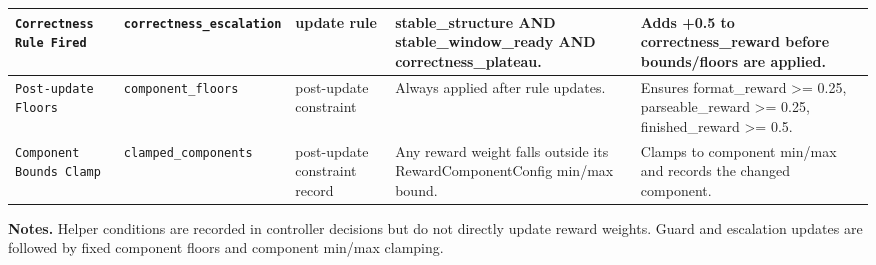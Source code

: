 \documentclass[10pt]{article}
\begin{document}
\begin{longtable}{L{0.14\textwidth} L{0.14\textwidth} L{0.11\textwidth} L{0.32\textwidth} L{0.22\textwidth}}
\midrule
\texttt{Correctness Rule Fired} &
\texttt{correctness\_escalation} &
update rule &
stable\_structure AND stable\_window\_ready AND correctness\_plateau. &
Adds +0.5 to correctness\_reward before bounds/floors are applied. \\
\midrule
\texttt{Post-update Floors} &
\texttt{component\_floors} &
post-update constraint &
Always applied after rule updates. &
Ensures format\_reward >= 0.25, parseable\_reward >= 0.25, finished\_reward >= 0.5. \\
\midrule
\texttt{Component Bounds Clamp} &
\texttt{clamped\_components} &
post-update constraint record &
Any reward weight falls outside its RewardComponentConfig min/max bound. &
Clamps to component min/max and records the changed component. \\
\bottomrule
\end{longtable}
\vspace{0.35em}
\noindent\textbf{Notes.} Helper conditions are recorded in controller decisions but do not directly update reward weights. Guard and escalation updates are followed by fixed component floors and component min/max clamping.
\end{document}
